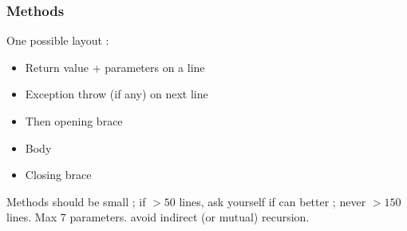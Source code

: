 \documentclass[12pt,a4paper]{article}
\begin{document}
\subsubsection{Methods}
One possible layout :
\begin{itemize}
    \item Return value + parameters on a line
    \item Exception throw (if any) on next line
    \item Then opening brace
    \item Body
    \item Closing brace
\end{itemize}
Methods should be small ; if $> 50$ lines, ask yourself if can better ; never $ > 150$ lines. Max 7 parameters. avoid indirect (or mutual) recursion.
\end{document}
